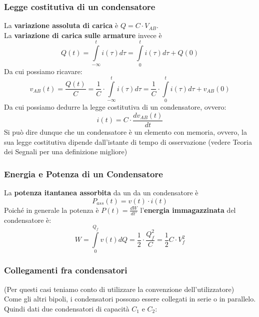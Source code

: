 \documentclass[../main.tex]{subfiles}
\begin{document}
	\subsubsection{Legge costitutiva di un condensatore}
	La \textbf{variazione assoluta di carica} è $Q = C \cdot V_{AB}$.\\
	La \textbf{variazione di carica sulle armature} invece è
	\[Q(t) = \int\limits_{-\infty}^{t} i(\tau) d\tau = \int\limits_{0}^{t} i(\tau) d\tau + Q(0)\]
	Da cui possiamo ricavare:
	\begin{equation}
		v_{AB} (t) = \frac{Q(t)}{C} = \frac{1}{C} \cdot \int\limits_{-\infty}^{t} i(\tau) d\tau = \frac{1}{C} \cdot \int\limits_{0}^{t} i(\tau) d\tau + v_{AB}(0)
	\end{equation}
	Da cui possiamo dedurre la legge costitutiva di un condensatore, ovvero:
	\begin{equation}
		i(t) = C \cdot \frac{d v_{AB}(t)}{dt}
	\end{equation}
	Si può dire dunque che un condensatore è un elemento con memoria, ovvero, la sua legge costitutiva dipende dall'istante di tempo di osservazione (vedere Teoria dei Segnali per una definizione migliore)
	\subsubsection{Energia e Potenza di un Condensatore}
	La \textbf{potenza itantanea assorbita} da un da un condensatore è
	\begin{equation}
		P_{ass}(t) = v(t) \cdot i(t)
	\end{equation}
	Poiché in generale la potenza è $P(t) = \frac{dW}{dt'}$ l'\textbf{energia immagazzinata} del condensatore è: 
	\begin{equation}
		W = \int\limits_{0}^{Q_f} v(t) dQ = \frac{1}{2} \cdot \frac{Q_f^2}{C} = \frac{1}{2} C \cdot V_f^2
	\end{equation}
	\subsubsection{Collegamenti fra condensatori}
	(Per questi casi teniamo conto di utilizzare la convenzione dell'utilizzatore)\\
	Come gli altri bipoli, i condensatori possono essere collegati in serie o in parallelo.\\
	Quindi dati due condensatori di capacità $C_1$ e $C_2$:
\end{document}
